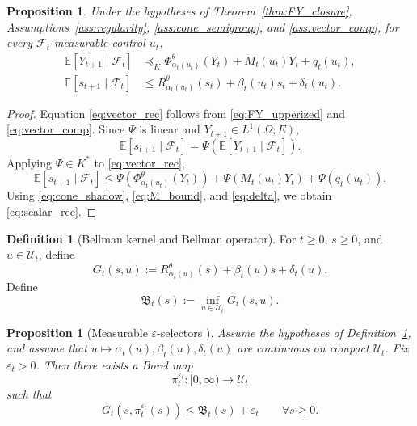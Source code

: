 \documentclass{article}
\newtheorem{proposition}[theorem]{Proposition}
\theoremstyle{definition}
\newtheorem{definition}[theorem]{Definition}
\begin{document}
\begin{proposition}
\label{prop:vector_scalar}
Under the hypotheses of Theorem~\ref{thm:FY_closure}, Assumptions~\ref{ass:regularity}, \ref{ass:cone_semigroup}, and \ref{ass:vector_comp}, for every $\mathcal F_t$-measurable control $u_t$,
\begin{align}
\mathbb E[Y_{t+1}\mid\mathcal F_t]
&\preceq_K
\Phi_{\alpha_t(u_t)}^\theta(Y_t)+M_t(u_t)Y_t+q_t(u_t),
\label{eq:vector_rec}
\\
\mathbb E[s_{t+1}\mid\mathcal F_t]
&\le
R_{\alpha_t(u_t)}^\theta(s_t)+\beta_t(u_t)s_t+\delta_t(u_t).
\label{eq:scalar_rec}
\end{align}
\end{proposition}

\begin{proof}
Equation \eqref{eq:vector_rec} follows from \eqref{eq:FY_upperized} and \eqref{eq:vector_comp}.
Since $\Psi$ is linear and $Y_{t+1}\in L^1(\Omega;E)$,
\[
\mathbb E[s_{t+1}\mid\mathcal F_t]
=
\Psi(\mathbb E[Y_{t+1}\mid\mathcal F_t]).
\]
Applying $\Psi\in K^\ast$ to \eqref{eq:vector_rec},
\[
\mathbb E[s_{t+1}\mid\mathcal F_t]
\le
\Psi(\Phi_{\alpha_t(u_t)}^\theta(Y_t))
+
\Psi(M_t(u_t)Y_t)
+
\Psi(q_t(u_t)).
\]
Using \eqref{eq:cone_shadow}, \eqref{eq:M_bound}, and \eqref{eq:delta}, we obtain \eqref{eq:scalar_rec}.
\end{proof}

\begin{definition}[Bellman kernel and Bellman operator]
\label{def:Bellman}
For $t\ge 0$, $s\ge 0$, and $u\in\mathcal U_t$, define
\begin{equation*}
G_t(s,u)
:=
R_{\alpha_t(u)}^\theta(s)+\beta_t(u)s+\delta_t(u).
\end{equation*}
Define
\begin{equation*}
\mathfrak B_t(s)
:=
\inf_{u\in\mathcal U_t}G_t(s,u).
\end{equation*}
\end{definition}

\begin{proposition}[Measurable $\varepsilon$-selectors {\cite{Bellman}}]
\label{prop:eps}
Assume the hypotheses of Definition~\ref{def:Bellman}, and assume that $u\mapsto \alpha_t(u),\beta_t(u),\delta_t(u)$ are continuous on compact $\mathcal U_t$.
Fix $\varepsilon_t>0$.
Then there exists a Borel map
\[
\pi_t^{\varepsilon_t}:[0,\infty)\to\mathcal U_t
\]
such that
\begin{equation}
G_t(s,\pi_t^{\varepsilon_t}(s))
\le
\mathfrak B_t(s)+\varepsilon_t
\qquad
\forall s\ge 0.
\label{eq:eps_selector}
\end{equation}
\end{proposition}
\end{document}
